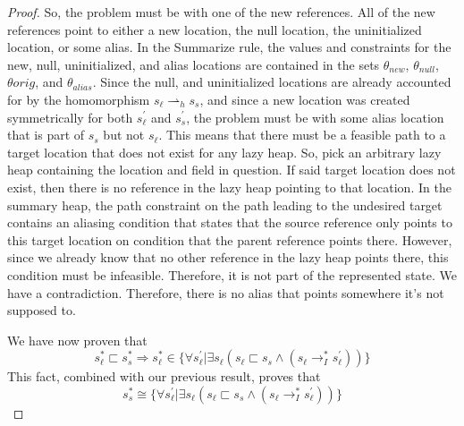 \begin{proof}
So, the problem must be with one of the new references. All of the new references point to either a new location, the null location, the uninitialized location, or some alias. In the Summarize rule, the values and constraints for the new, null, uninitialized, and alias locations are contained in the sets $\theta_{new}$, $\theta_{null}$, $\theta{orig}$, and $\theta_{alias}$. Since the null, and uninitialized locations are already accounted for by the homomorphism $s_\ell \rightharpoonup_h s_s$, and since a new location was created symmetrically for both $s_\ell^\prime$ and $s_s^\prime$, the problem must be with some alias location that is part of $s_s$ but not $s_\ell$. This means that there must be a feasible path to a target location that does not exist for any lazy heap. So, pick an arbitrary lazy heap containing the location and field in question. If said target location does not exist, then there is no reference in the lazy heap pointing to that location. In the summary heap, the path constraint on the path leading to the undesired target contains an aliasing condition that states that the source reference only points to this target location on condition that the parent reference points there. However, since we already know that no other reference in the lazy heap points there, this condition must be infeasible. Therefore, it is not part of the represented state. We have a contradiction. Therefore, there is no alias that points somewhere it's not supposed to.

We have now proven that 
$$ s_\ell^* \sqsubset s_s^*  \Rightarrow  s_\ell^* \in \{\forall s_\ell^\prime | \exists s_\ell (s_\ell \sqsubset s_s \wedge (s_\ell \rightarrow_I^* s_\ell^\prime) ) \}$$
This fact, combined with our previous result, proves that
$$s_s^*  \cong \{\forall s_\ell^\prime | \exists s_\ell (s_\ell \sqsubset s_s \wedge (s_\ell \rightarrow_I^* s_\ell^\prime) ) \}$$

\end{proof}

